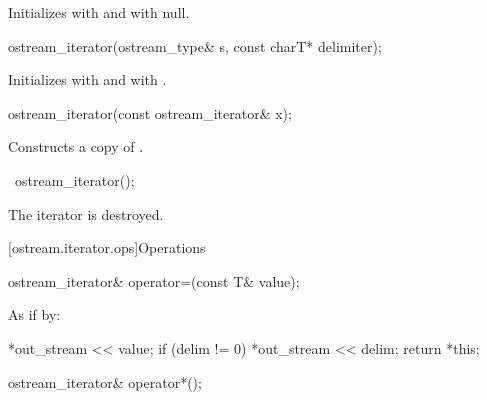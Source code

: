 \begin{itemdescr}
\pnum
\effects
Initializes  with  and
 with null.
\end{itemdescr}


%
\begin{itemdecl}
ostream_iterator(ostream_type& s, const charT* delimiter);
\end{itemdecl}

\begin{itemdescr}
\pnum
\effects
Initializes  with  and
 with .
\end{itemdescr}


%
\begin{itemdecl}
ostream_iterator(const ostream_iterator& x);
\end{itemdecl}

\begin{itemdescr}
\pnum
\effects
Constructs a copy of .
\end{itemdescr}

%
\begin{itemdecl}
~ostream_iterator();
\end{itemdecl}

\begin{itemdescr}
\pnum
\effects
The iterator is destroyed.
\end{itemdescr}

[ostream.iterator.ops]{Operations}

%
\begin{itemdecl}
ostream_iterator& operator=(const T& value);
\end{itemdecl}

\begin{itemdescr}
\pnum
\effects
As if by:
\begin{codeblock}
*out_stream << value;
if (delim != 0)
  *out_stream << delim;
return *this;
\end{codeblock}
\end{itemdescr}

%
\begin{itemdecl}
ostream_iterator& operator*();
\end{itemdecl}

